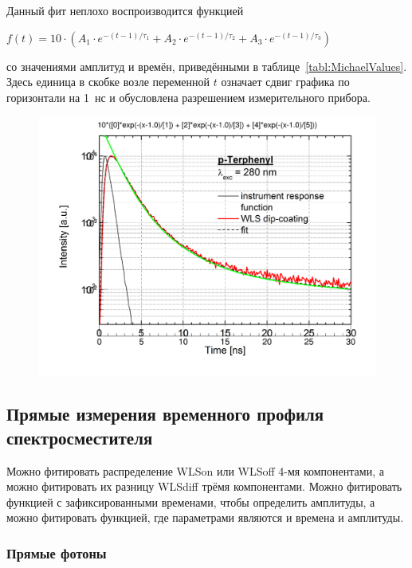 Данный фит неплохо воспроизводится функцией

{\centering
$ f(t) = 10 \cdot ( A_{1} \cdot e^{-(t-1) / \tau_{1}} + A_{2} \cdot e^{-(t-1) / \tau_{2}} + A_{3} \cdot e^{-(t-1) / \tau_{3}} ) $ \\
}

со значениями амплитуд и времён, приведёнными в таблице~\ref{tabl:MichaelValues}. Здесь единица в скобке возле переменной $ t $ означает сдвиг графика по горизонтали на 1~нс и обусловлена разрешением измерительного прибора.

\begin{figure}[H]
\includegraphics[width=1.0\textwidth]{pictures/FluoroFitting_shift_1ns_2.png}
\caption{}
\label{fig:MichaelProfileFit}
\end{figure}


\subsection{Прямые измерения временного профиля спектросместителя}

Можно фитировать распределение WLS\textunderscore on или WLS\textunderscore off 4-мя компонентами, а можно фитировать их разницу WLS\textunderscore diff трёмя компонентами. Можно фитировать функцией с зафиксированными временами, чтобы определить амплитуды, а можно фитировать функцией, где параметрами являются и времена и амплитуды.

\subsubsection{Прямые фотоны}


